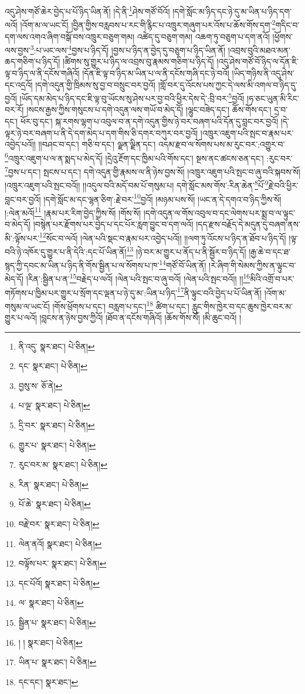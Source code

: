 འདུ་ཤེས་གཙོ་ཆེར་བྱེད་པ་པོ་ཉིད་ཡིན་ནོ། །དེ་ནི་\footnote{ནི་འདུ་  སྣར་ཐང་།  པེ་ཅིན། }ཤེས་གཙོ་བོའོ། །དགེ་སློང་མ་ཉིད་དང་ཉེ་དུ་མ་ཡིན་པ་ཉིད་དག་ལའོ། །འོག་མ་ལ་ཡང་ངོ། །བྱིན་གྱིས་བརླབས་པ་རང་གི་རྙིང་པ་འཁྲུར་གཞུག་པར་འོས་པ་ཆོས་གོས་དག་\footnote{དང་  སྣར་ཐང་།  པེ་ཅིན། }གདིང་བ་དག་ལས་འགའ་ཞིག་བསྒོ་བས་འཁྲུར་བཅུག་གམ། འཚེད་དུ་བཅུག་གམ། འཆག་ཏུ་བཅུག་པ་དག་ནའོ། །ཕྱོགས་ལས་བྱས་\footnote{བྱསུ་ས་  ཅོ་ནེ། }:པ་ཡང་ལས་\footnote{པ་ལྔ་  སྣར་ཐང་།  པེ་ཅིན། }བྱས་པ་ཉིད་དོ། །བྱས་པ་ཉིད་ན་བྱེད་དུ་བཅུག་པ་ཉིད་ཡིན་ནོ། །འབྲས་བུའི་མཐའ་མན་ཆད་གཅིག་པ་ཉིད་དོ། །ཚིགས་སུ་གྱུར་པ་ཉིད་ལ་འབྲས་བུ་རྣམས་གཅིག་པ་ཉིད་དོ། །འདུ་ཤེས་གཙོ་བོ་ཉིད་ལ་དོན་ཇི་ལྟ་བ་ཉིད་ལ་ནི་དངོས་གཞིའོ། །དོན་ཇི་ལྟ་བ་ཉིད་མ་ཡིན་པ་ལ་ནི་དངོས་གཞི་དང་ཉེ་བའོ། །ཡིད་གཉིས་ནི་འདུ་ཤེས་དང་འདྲའོ། །དགེ་འདུན་གྱི་ཁྲིམས་སུ་བྱ་བ་བསྲུང་བར་བྱའོ། །གློ་བར་དུ་འོངས་པས་ཀྱང་དེ་ལས་མི་འགལ་བ་ཉིད་དུ་བྱའོ། །ཡོད་དམ་མེད་པ་ཉིད་དང་ཇི་ལྟ་བུ་ཡོངས་སུ་ཤེས་པར་བྱ་བའི་ཕྱིར་དེས་དེ་:བྲི་བར་\footnote{དྲི་བར་  སྣར་ཐང་།  པེ་ཅིན། }བྱའོ། །ཧ་ཅང་ཡུན་མི་རིང་བར་རོ། །སངས་རྒྱས་ཀྱིས་གསུངས་པ་དགེ་འདུན་ལས་གཡོ་བ་མེད་དོ། །ལྷུང་བཟེད་དང་། ཆོས་གོས་དང་། དྲ་བ་དང་། ཕོར་བུ་དང་། སྐ་རགས་ལྷག་པ་འབུལ་བ་ན་དགེ་འདུན་གྱིས་ཉེ་བར་བཞག་པའི་དོན་དུ་བླང་བར་བྱའོ། །དེ་ལྟར་ཉེ་བར་བཞག་པ་ནི་དེ་དག་མེད་པ་དག་གིས་ཅི་དགར་བཀུར་བར་བྱའོ། །འཁྲུར་འཇུག་པའི་སྤང་བ་རྣམ་པར་འབྱེད་པའོ།། །།བཤང་བ་དང་། གཅི་བ་དང་། ལྗན་ལྗིན་དང་། འདམ་རྫབ་ལ་སོགས་པས་མ་རུང་བར་:འགྱུར་བ་\footnote{གྱུར་པ་  སྣར་ཐང་།  པེ་ཅིན། }འཁྲུར་འཇུག་པ་ལ་ན་སྨད་པ་མེད་དོ། །དྲེའུ་རྔོག་དང་ཁྱིམ་པའི་གོས་དང་། སྔས་ནང་ཚངས་ཅན་དང་། :རུང་བར་\footnote{རུང་བར་མ་  སྣར་ཐང་།  པེ་ཅིན། }བྱས་པ་དང་། སྤངས་པ་དང་། དགེ་འདུན་གྱི་རྣམས་ལ་ནི་ཉེས་བྱས་སོ། །འཁྲུར་འཇུག་པའི་སྤང་བ་ཞུ་བའི་སྐབས་སོ། །འཁྲུར་འཇུག་པའི་སྤང་བའོ།། །།འདུལ་བའི་མདོ་བམ་པོ་གསུམ་པ། དགེ་སློང་མས་གོས་:རིན་ཆེན་\footnote{རིན་  སྣར་ཐང་།  པེ་ཅིན། }པོ་\footnote{པོ་ཆེ་  སྣར་ཐང་།  པེ་ཅིན། }རྗེ་བའི་ཕྱིར་བླང་བར་བྱའོ། །དགེ་སློང་མ་དང་ལྷན་ཅིག་:རྗེ་བར་\footnote{བརྗེ་བར་  སྣར་ཐང་།  པེ་ཅིན། }བྱའོ། །མཉམ་པས་སོ། །ཡང་ན་དེ་དགའ་བ་ཉིད་ཀྱིས་སོ། །:ལེན་མའོ།\footnote{ལེན་ནའོ།  སྣར་ཐང་།  པེ་ཅིན། } །རྣམ་པར་རིག་བྱེད་ཀྱིས་སོ། །གོས་སོ། །དགེ་འདུན་ལ་གོས་འབུལ་བ་དང་ལེགས་པར་སྨྲ་བ་ལ་ལྟུང་བ་མེད་དོ། །བསྙེན་པར་རྫོགས་པར་བྱེད་པ་དང་པོར་རླག་བྱུང་བ་དག་ལའོ། །དད་རྫས་བརྗོད་དེ་མདུན་དུ་བཞག་ནས་མི་:ལྟོས་པར་\footnote{བལྟོས་པར་  སྣར་ཐང་།  པེ་ཅིན། }སོང་བ་ལའོ། །ལེན་པའི་སྡང་བ་རྣམ་པར་འབྱེད་པའོ།། །།ལག་ཏུ་འོངས་པ་ཉིད་ན་ཐོབ་པ་ཉིད་དོ། །ལྟ་བའི་ཉེ་འཁོར་དུ་གྱུར་པ་ནི་དེའི་:དང་པོ་ཡིན་ནོ།\footnote{དང་པོའོ།  སྣར་ཐང་།  པེ་ཅིན། } །ཉེ་བར་མ་གྱུར་པ་ནོད་པ་ནི་སྦྱོར་བ་ཉིད་དོ། །རྒྱ་ཆེ་བ་དང་ཐ་སྙད་ཀྱི་དབང་མ་ཡིན་པ་ཉིད་ནི་གོས་སྦྱིན་པ་ལ་སོགས་པ་ཁ་\footnote{ལ་  སྣར་ཐང་།  པེ་ཅིན། }གཙོ་བོ་ཡིན་ནོ། །རེ་ཞིག་གི་སེམས་ཀྱིས་ན་ལྟུང་བ་མེད་དོ། །རིན་:སྦྱིན་པ་ན་\footnote{སྦྱིན་པ་  སྣར་ཐང་།  པེ་ཅིན། }བརྗེད་པ་ལའོ། །ལེན་པའི་སྤང་བ་ཞུ་བའོ། །ལེན་པའི་སྤང་བའོ།། །།\footnote{། །  སྣར་ཐང་།  པེ་ཅིན། }མིའི་འགྲོ་བ་པར་གཏོགས་པ་ཁྱིམ་པར་གྱུར་པ་སྲོག་དང་ལྡན་པ་ཉེ་དུ་མ་:ཡིན་པ་ཉིད་\footnote{ཡིན་པ་  སྣར་ཐང་།  པེ་ཅིན། }ནི་ལྟུང་བའི་བྱེད་པ་པོ་ཡིན་ནོ། །འོག་མ་གསུམ་ལ་ཡང་ངོ། །གོས་ཕྲོགས་པ་དང་། བརླག་པ་དང་།\footnote{དང་དང་།  སྣར་ཐང་། } ཚིག་པ་དང་། རླུང་གིས་ཁྱེར་བ་དང་ཆུས་ཁྱེར་བར་མ་གྱུར་པ་ལའོ། །བླངས་ན་ཉེས་བྱས་ཀྱིའོ། །ཐོབ་ན་དངོས་གཞིའོ། །ཆོས་གོས་སོ། །མི་ཆུང་བའོ། །
